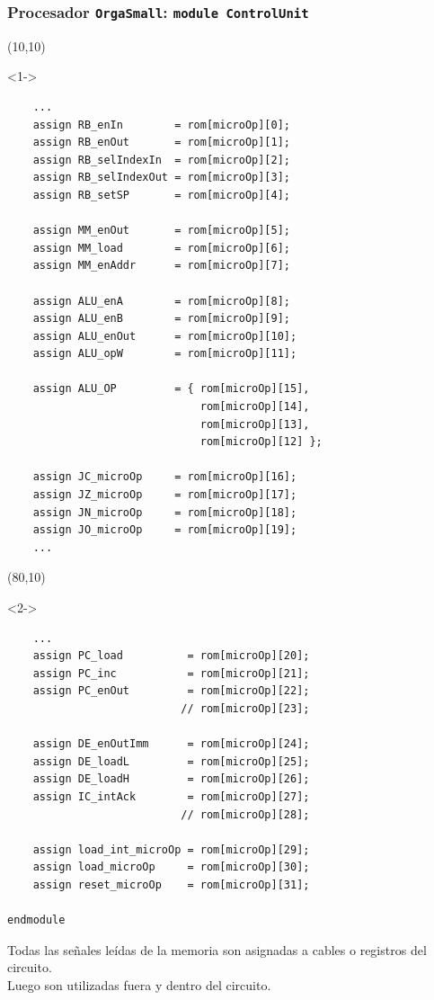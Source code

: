 \documentclass[aspectratio=169]{beamer}
\begin{document}
\begin{frame}[fragile,t]
    \frametitle{Procesador \texttt{OrgaSmall}: \texttt{module ControlUnit}}
    \begin{textblock}{65}(10,10)
    \begin{onlyenv}<1->
\lstset{basicstyle=\tiny}
\begin{lstlisting}
    ...
    assign RB_enIn        = rom[microOp][0];
    assign RB_enOut       = rom[microOp][1];
    assign RB_selIndexIn  = rom[microOp][2];
    assign RB_selIndexOut = rom[microOp][3];
    assign RB_setSP       = rom[microOp][4];
    
    assign MM_enOut       = rom[microOp][5];
    assign MM_load        = rom[microOp][6];
    assign MM_enAddr      = rom[microOp][7];
                      
    assign ALU_enA        = rom[microOp][8];
    assign ALU_enB        = rom[microOp][9];
    assign ALU_enOut      = rom[microOp][10];
    assign ALU_opW        = rom[microOp][11];
    
    assign ALU_OP         = { rom[microOp][15],
                              rom[microOp][14],
                              rom[microOp][13],
                              rom[microOp][12] };
    
    assign JC_microOp     = rom[microOp][16];
    assign JZ_microOp     = rom[microOp][17];
    assign JN_microOp     = rom[microOp][18];
    assign JO_microOp     = rom[microOp][19];
    ...
\end{lstlisting}
    \end{onlyenv}
    \end{textblock}
    \begin{textblock}{65}(80,10)
    \begin{onlyenv}<2->
\lstset{basicstyle=\tiny}
\begin{lstlisting}
    ...
    assign PC_load          = rom[microOp][20];
    assign PC_inc           = rom[microOp][21];
    assign PC_enOut         = rom[microOp][22];
                           // rom[microOp][23];
    
    assign DE_enOutImm      = rom[microOp][24];
    assign DE_loadL         = rom[microOp][25];
    assign DE_loadH         = rom[microOp][26];
    assign IC_intAck        = rom[microOp][27];
                           // rom[microOp][28];
    
    assign load_int_microOp = rom[microOp][29];
    assign load_microOp     = rom[microOp][30];
    assign reset_microOp    = rom[microOp][31];
    
endmodule
\end{lstlisting}
    \small
    Todas las señales leídas de la memoria son asignadas a cables o registros del circuito.\\
    \bigskip
    \textcolor{verdeuca}{Luego son utilizadas fuera y dentro del circuito.}
    \end{onlyenv}
    \end{textblock}
\end{frame}
\end{document}

